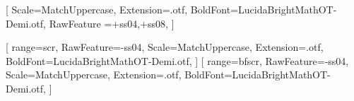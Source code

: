     [%
    	  Scale=MatchUppercase,
    	  Extension=.otf,
    	  BoldFont=LucidaBrightMathOT-Demi.otf,
    	  RawFeature ={+ss04,+ss08}, %
    ]
 
% 
    [%
    	  range={scr},%
    	  RawFeature={-ss04},
    	  Scale=MatchUppercase,
          Extension=.otf,
    	  BoldFont=LucidaBrightMathOT-Demi.otf,%
    ]
    [%
    	  range={bfscr},%
    	  RawFeature={-ss04},
    	  Scale=MatchUppercase,
          Extension=.otf,
    	  BoldFont=LucidaBrightMathOT-Demi.otf,
    ]
    \setoperatorfont\normalfont
    
